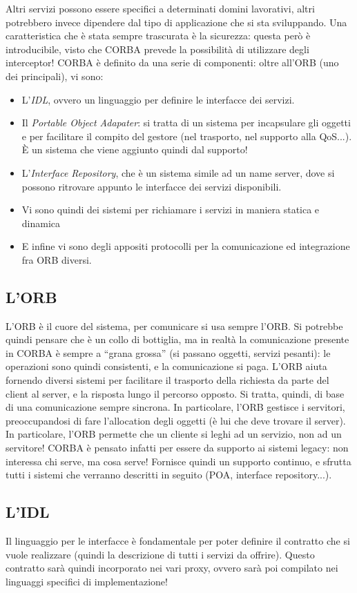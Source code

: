 Altri servizi possono essere specifici a determinati domini lavorativi, altri potrebbero invece dipendere dal tipo di
applicazione che si sta sviluppando.
Una caratteristica che è stata sempre trascurata è la sicurezza: questa però è introducibile, visto che CORBA prevede
la possibilità di utilizzare degli interceptor!
CORBA è definito da una serie di componenti: oltre all'ORB (uno dei principali), vi sono:
\begin{itemize}
 \item L'\textit{IDL}, ovvero un linguaggio per definire le interfacce dei servizi.
 \item Il \textit{Portable Object Adapater}: si tratta di un sistema per incapsulare gli oggetti e per facilitare il
compito del  gestore (nel trasporto, nel supporto alla QoS...). È un sistema che viene aggiunto quindi dal supporto!
 \item L'\textit{Interface Repository}, che è un sistema simile ad un name server, dove si possono ritrovare appunto le
 interfacce dei servizi disponibili.
 \item Vi sono quindi dei sistemi per richiamare i servizi in maniera statica e dinamica
 \item E infine vi sono degli appositi protocolli per la comunicazione ed integrazione fra ORB diversi.
\end{itemize}
\subsection{L'ORB}
L'ORB è il cuore del sistema, per comunicare si usa sempre l'ORB. Si potrebbe quindi pensare che è un collo di
bottiglia, ma in realtà la comunicazione presente in CORBA è sempre a ``grana grossa'' (si passano oggetti, servizi
pesanti): le operazioni sono quindi consistenti, e la comunicazione si paga. L'ORB aiuta fornendo diversi sistemi per
facilitare il trasporto della richiesta da parte del client al server, e la risposta lungo il percorso opposto. Si
tratta, quindi, di base di una comunicazione sempre sincrona.
In particolare, l'ORB gestisce i servitori, preoccupandosi di fare l'allocation degli oggetti (è lui che deve trovare il
server). In particolare, l'ORB permette che un cliente si leghi ad un servizio, non ad un servitore! CORBA è pensato
infatti per essere da supporto ai sistemi legacy: non interessa chi serve, ma cosa serve! Fornisce quindi un supporto
continuo, e sfrutta tutti i sistemi che verranno descritti in seguito (POA, interface repository...).
\subsection{L'IDL}
Il linguaggio per le interfacce è fondamentale per poter definire il contratto che si vuole realizzare (quindi la
descrizione di tutti i servizi da offrire). Questo contratto sarà quindi incorporato nei vari proxy, ovvero sarà poi
compilato nei linguaggi specifici di implementazione!

